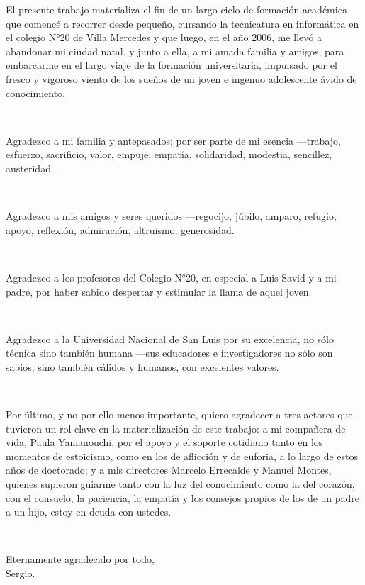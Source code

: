 {\parindent0pt
\begin{em}
El presente trabajo materializa el fin de un largo ciclo de formación académica que comencé a recorrer desde pequeño, cursando la tecnicatura en informática en el colegio N°20 de Villa Mercedes y que luego, en el año 2006, me llevó a abandonar mi ciudad natal, y junto a ella, a mi amada familia y amigos, para embarcarme en el largo viaje de la formación universitaria, impulsado por el fresco y vigoroso viento de los sueños de un joven e ingenuo adolescente ávido de conocimiento.

\

Agradezco a mi familia y antepasados; por ser parte de mi esencia ---trabajo, esfuerzo, sacrificio, valor, empuje, empatía, solidaridad, modestia, sencillez, austeridad.

\

Agradezco a mis amigos y seres queridos ---regocijo, júbilo, amparo, refugio, apoyo, reflexión, admiración, altruismo, generosidad.

\

Agradezco a los profesores del Colegio N°20, en especial a Luis Savid y a mi padre, por haber sabido despertar y estimular la llama de aquel joven.

\

Agradezco a la Universidad Nacional de San Luis por su excelencia, no sólo técnica sino también humana ---sus educadores e investigadores no sólo son sabios, sino también cálidos y humanos, con excelentes valores.

\

Por último, y no por ello menos importante, quiero agradecer a tres actores que tuvieron un rol clave en la materialización de este trabajo: a mi compañera de vida, Paula Yamanouchi, por el apoyo y el soporte cotidiano tanto en los momentos de estoicismo, como en los de aflicción y de euforia, a lo largo de estos años de doctorado; y a mis directores Marcelo Errecalde y Manuel Montes, quienes supieron guiarme tanto con la luz del conocimiento como la del corazón, con el consuelo, la paciencia, la empatía y los consejos propios de los de un padre a un hijo, estoy en deuda con ustedes.

\


\begin{flushright}
Eternamente agradecido por todo,\\
Sergio.
\end{flushright}

\end{em}
}


